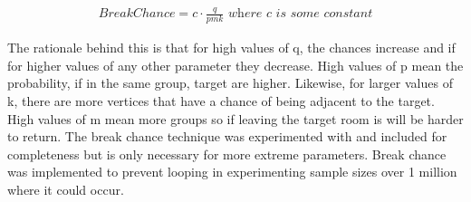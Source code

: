 \documentclass[12pt,a4paper]{article}
\begin{document}
\begin{align*}
	Break Chance = c \cdot{}\frac{q}{pmk}  \textit{ where c is some constant}
\end{align*}

The rationale behind this is that for high values of q, the chances increase and if for higher values of any other parameter they decrease. High values of p mean the probability, if in the same group, target are higher. Likewise, for larger values of k, there are more vertices that have a chance of being adjacent to the target. High values of m mean more groups so if leaving the target room is will be harder to return. The break chance technique was experimented with and included for completeness but is only necessary for more extreme parameters. Break chance was implemented to prevent looping in experimenting sample sizes over 1 million where it could occur. 
\end{document}

